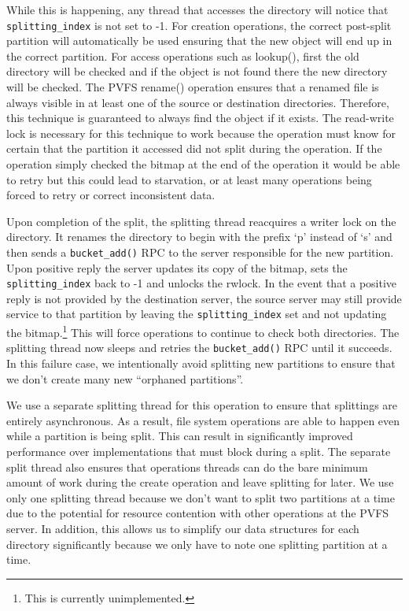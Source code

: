 \documentclass[twocolumn,letterpaper]{article}
\newcommand{\code}[1]{\texttt{#1}}
\begin{document}
While this is happening, any thread that accesses the directory will notice that
\code{splitting\_\-index} is not set to -1.  For creation operations, the
correct post-split partition will automatically be used ensuring that the new
object will end up in the correct partition.  For access operations such as
lookup(), first the old directory will be checked and if the object is not
found there the new directory will be checked.  The PVFS rename() operation
ensures that a renamed file is always visible in at least one of the source or
destination directories.  Therefore, this technique is guaranteed to always
find the object if it exists.  The read-write lock is necessary for this technique to
work because the operation must know for certain that the partition it
accessed did not split during the operation.  If the operation simply checked
the bitmap at the end of the operation it would be able to retry but this
could lead to starvation, or at least many operations being forced to retry or
correct inconsistent data.

Upon completion of the split, the splitting thread reacquires a writer lock on
the directory.  It renames the directory to begin with the prefix `p' instead of
`s' and then sends a \code{bucket\_\-add()} RPC to the server responsible for the new
partition.  Upon positive reply the server updates its copy of the bitmap, sets
the \code{splitting\_\-index} back to -1 and unlocks the rwlock.  In the event that
a positive reply is not provided by the destination server, the source server
may still provide service to that partition by leaving the
\code{splitting\_\-index} set and not updating the bitmap.\footnote{This is
currently unimplemented.}  This will force operations to continue to check
both directories.  The splitting thread now sleeps and retries the
\code{bucket\_\-add()} RPC until it succeeds.  In this failure case, we
intentionally avoid splitting new partitions to ensure that we don't create
many new ``orphaned partitions''.

We use a separate splitting thread for this operation to ensure that splittings
are entirely asynchronous.  As a result, file system operations are able to
happen even while a partition is being split.  This can result in significantly
improved performance over implementations that must block during a split.  The
separate split thread also ensures that operations threads can do the bare
minimum amount of work during the create operation and leave splitting for
later.  We use only one splitting thread because we don't want to split two
partitions at a time due to the potential for resource contention with other
operations at the PVFS server.  In addition, this allows us to simplify our data
structures for each directory significantly because we only have to note one
splitting partition at a time.
\end{document}
